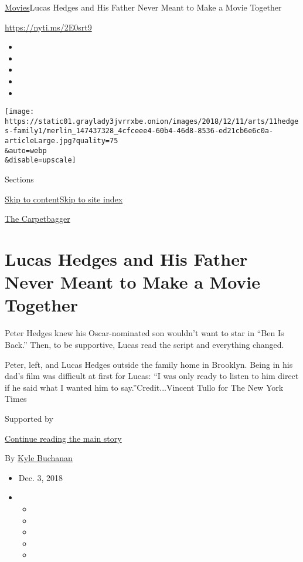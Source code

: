 \href{/section/movies}{Movies}\textbar{}Lucas Hedges and His Father
Never Meant to Make a Movie Together

\url{https://nyti.ms/2E0srt9}

\begin{itemize}
\item
\item
\item
\item
\item
\end{itemize}

\texttt{[image: https://static01.graylady3jvrrxbe.onion/images/2018/12/11/arts/11hedges-family1/merlin\_147437328\_4cfceee4-60b4-46d8-8536-ed21cb6e6c0a-articleLarge.jpg?quality=75\\\&auto=webp\\\&disable=upscale]}

Sections

\protect\hyperlink{site-content}{Skip to
content}\protect\hyperlink{site-index}{Skip to site index}

\href{/column/the-carpetbagger}{The Carpetbagger}

\hypertarget{lucas-hedges-and-his-father-never-meant-to-make-a-movie-together}{%
\section{Lucas Hedges and His Father Never Meant to Make a Movie
Together}\label{lucas-hedges-and-his-father-never-meant-to-make-a-movie-together}}

Peter Hedges knew his Oscar-nominated son wouldn't want to star in ``Ben
Is Back.'' Then, to be supportive, Lucas read the script and everything
changed.

Peter, left, and Lucas Hedges outside the family home in Brooklyn. Being
in his dad's film was difficult at first for Lucas: ``I was only ready
to listen to him direct if he said what I wanted him to
say.''Credit...Vincent Tullo for The New York Times

Supported by

\protect\hyperlink{after-sponsor}{Continue reading the main story}

By \href{https://www.nytimes3xbfgragh.onion/by/kyle-buchanan}{Kyle
Buchanan}

\begin{itemize}
\item
  Dec. 3, 2018
\item
  \begin{itemize}
  \item
  \item
  \item
  \item
  \item
  \end{itemize}
\end{itemize}

